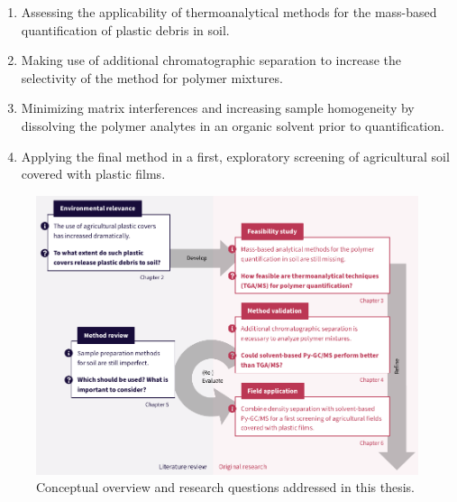 \begin{enumerate}
	\item\label{en:thermoanalysis} Assessing the applicability of thermoanalytical methods for the mass-based quantification of plastic debris in soil.
	\item\label{en:chromatography} Making use of additional chromatographic separation to increase the selectivity of the method for polymer mixtures.
	\item\label{en:dissolution} Minimizing matrix interferences and increasing sample homogeneity by dissolving the polymer analytes in an organic solvent prior to quantification. 
	\item\label{en:application} Applying the final method in a first, exploratory screening of agricultural soil covered with plastic films.
\end{enumerate}

\begin{figure}
	\centering
	\label{fig:thesis-overview}
	\includegraphics[width=\textwidth]{figures/thesis-overview}
	\caption{Conceptual overview and research questions addressed in this thesis.}
\end{figure}

